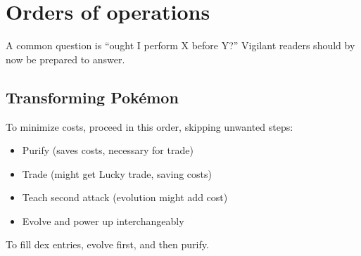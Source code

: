 \chapter{Orders of operations\label{chap:ooo}}
A common question is ``ought I perform X before Y?''
Vigilant readers should by now be prepared to answer.

\section{Transforming Pokémon\label{sec:pokemontransforms}}
To minimize costs, proceed in this order, skipping unwanted steps:
\begin{itemize}
\item Purify (saves costs, necessary for trade)
\item Trade (might get Lucky trade, saving costs)
\item Teach second attack (evolution might add cost)
\item Evolve and power up interchangeably
\end{itemize}
To fill dex entries, evolve first, and then purify.

